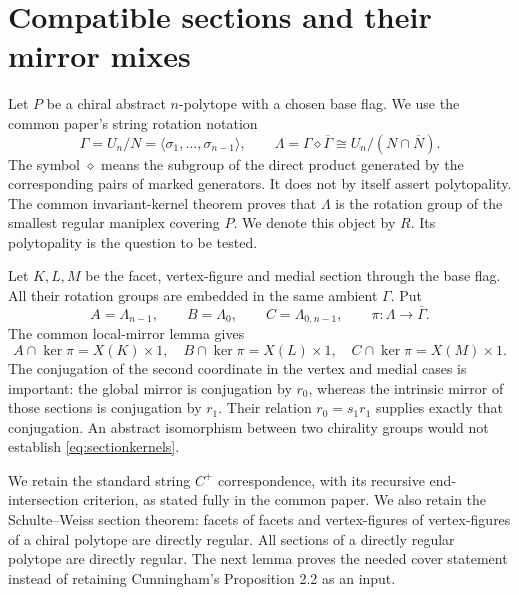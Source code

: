 \section{Compatible sections and their mirror mixes}
Let $P$ be a chiral abstract $n$-polytope with a chosen base flag. We use the common paper's string rotation notation
\[
 \Gamma=U_n/N=\langle\sigma_1,\ldots,\sigma_{n-1}\rangle,
 \qquad \Lambda=\Gamma\diamond\overline\Gamma
                    \cong U_n/(N\cap\overline N).
\]
The symbol $\diamond$ means the subgroup of the direct product generated by the corresponding pairs of marked generators. It does not by itself assert polytopality. The common invariant-kernel theorem proves that $\Lambda$ is the rotation group of the smallest regular maniplex covering $P$. We denote this object by $R$. Its polytopality is the question to be tested.

Let $K,L,M$ be the facet, vertex-figure and medial section through the base flag. All their rotation groups are embedded in the same ambient $\Gamma$. Put
\[
 A=\Lambda_{n-1},\qquad B=\Lambda_0,\qquad C=\Lambda_{0,n-1},
 \qquad \pi:\Lambda\longrightarrow\overline\Gamma.
\]
The common local-mirror lemma gives
\begin{equation}\label{eq:sectionkernels}
 A\cap\ker\pi=X(K)\times1,\quad
 B\cap\ker\pi=X(L)\times1,\quad
 C\cap\ker\pi=X(M)\times1.
\end{equation}
The conjugation of the second coordinate in the vertex and medial cases is important: the global mirror is conjugation by $r_0$, whereas the intrinsic mirror of those sections is conjugation by $r_1$. Their relation $r_0=s_1r_1$ supplies exactly that conjugation. An abstract isomorphism between two chirality groups would not establish \eqref{eq:sectionkernels}.

We retain the standard string $C^+$ correspondence, with its recursive end-intersection criterion, as stated fully in the common paper. We also retain the Schulte--Weiss section theorem: facets of facets and vertex-figures of vertex-figures of a chiral polytope are directly regular. All sections of a directly regular polytope are directly regular. The next lemma proves the needed cover statement instead of retaining Cunningham's Proposition 2.2 as an input.


